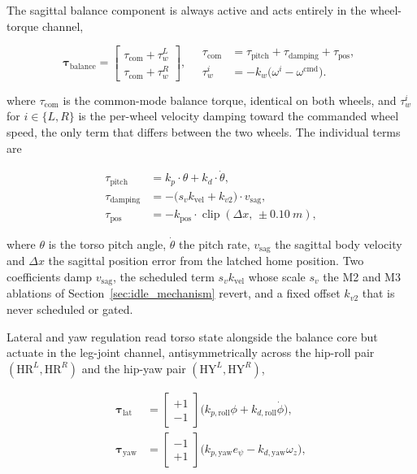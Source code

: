 \documentclass[a4paper,fleqn]{cas-dc}
\begin{document}
The sagittal balance component is always active and acts entirely in the
wheel-torque channel,

\begin{equation}
\boldsymbol{\tau}_{\text{balance}} =
\begin{bmatrix}
\tau_{\text{com}} + \tau_{w}^{L} \\
\tau_{\text{com}} + \tau_{w}^{R}
\end{bmatrix},
\quad
\begin{aligned}
\tau_{\text{com}} &= \tau_{\text{pitch}} + \tau_{\text{damping}} + \tau_{\text{pos}},\\
\tau_{w}^{i} &= -k_{w}\big(\omega^{i} - \omega^{\text{cmd}}\big).
\end{aligned}
\label{eq:balance}
\end{equation}

where $\tau_{\text{com}}$ is the common-mode balance torque, identical on both
wheels, and $\tau_{w}^{i}$ for $i\in\{L,R\}$ is the per-wheel velocity damping
toward the commanded wheel speed, the only term that differs between the two
wheels. The individual terms are

\begin{align}
\tau_{\text{pitch}} &= k_p\cdot\theta + k_d\cdot\dot{\theta},\\
\tau_{\text{damping}} &= -\big(s_v k_{\text{vel}} + k_{v2}\big)\cdot v_{\text{sag}},\\
\tau_{\text{pos}} &= -k_{\text{pos}}\cdot\operatorname{clip}(\Delta x,\,\pm\SI{0.10}{m}),
\end{align}

where $\theta$ is the torso pitch angle, $\dot{\theta}$ the pitch rate,
$v_{\text{sag}}$ the sagittal body velocity and $\Delta x$ the sagittal position
error from the latched home position. Two coefficients damp $v_{\text{sag}}$,
the scheduled term $s_v k_{\text{vel}}$ whose scale $s_v$ the M2 and M3
ablations of Section~\ref{sec:idle_mechanism} revert, and a fixed offset
$k_{v2}$ that is never scheduled or gated.

Lateral and yaw regulation read torso state alongside the balance core but
actuate in the leg-joint channel, antisymmetrically across the hip-roll pair
$(\mathrm{HR}^L,\mathrm{HR}^R)$ and the hip-yaw pair
$(\mathrm{HY}^L,\mathrm{HY}^R)$,

\begin{equation}
\begin{aligned}
\boldsymbol{\tau}_{\text{lat}} &=
\begin{bmatrix} +1 \\ -1 \end{bmatrix}
\big(k_{p,\text{roll}}\phi + k_{d,\text{roll}}\dot{\phi}\big),\\[2pt]
\boldsymbol{\tau}_{\text{yaw}} &=
\begin{bmatrix} -1 \\ +1 \end{bmatrix}
\big(k_{p,\text{yaw}}e_\psi - k_{d,\text{yaw}}\omega_z\big),
\end{aligned}
\label{eq:lat_yaw}
\end{equation}
\end{document}
